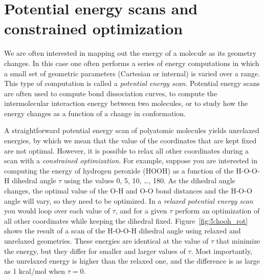 \documentclass[../Main/notes.tex]{subfiles}
\begin{document}
\section{Potential energy scans and constrained optimization}

We are often interested in mapping out the energy of a molecule as its geometry changes.
In this case one often performs a series of energy computations in which a small set of geometric parameters (Cartesian or internal) is varied over a range.
This type of computation is called a \emph{potential energy scan}.
Potential energy scans are often used to compute bond dissociation curves, to compute the intermolecular interaction energy between two molecules, or to study how the energy changes as a function of a change in conformation.

A straightforward potential energy scan of polyatomic molecules yields unrelaxed energies, by which we mean that the value of the coordinates that are kept fixed are not optimal.
However, it is possible to relax all other coordinates during a scan with a \emph{constrained optimization}.
For example, suppose you are interested in computing the energy of hydrogen peroxide (HOOH) as a function of the H-O-O-H dihedral angle $\tau$ using the values 0, 5, 10, \ldots, 180\textdegree.
As the dihedral angle changes, the optimal value of the O-H and O-O bond distances and the H-O-O angle will vary, so they need to be optimized.
In a \emph{relaxed potential energy scan} you would loop over each value of $\tau$, and for a given $\tau$  perform an optimization of all other coordinates while keeping the dihedral fixed.
Figure~\ref{fig:5:hooh_rot} shows the result of a scan of the H-O-O-H dihedral angle using relaxed and unrelaxed geometries.
These energies are identical at the value of $\tau$ that minimize the energy, but they differ for smaller and larger values of $\tau$.
Most importantly, the unrelaxed energy is higher than the relaxed one, and the difference is as large as 1 kcal/mol when $\tau = 0$. 

\end{document}
